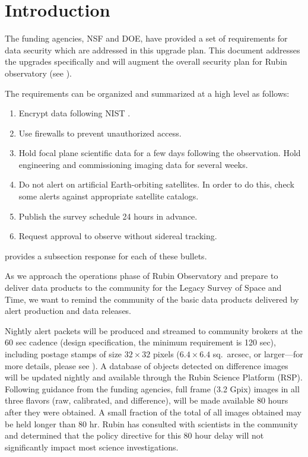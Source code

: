 \section{Introduction}

The funding agencies, NSF and DOE,  have provided a set of requirements for data security which are addressed in this upgrade plan.  This document addresses the upgrades specifically and will augment the overall security plan for Rubin observatory (see ).

The requirements can be organized and summarized at a high level as follows:
\begin{enumerate}

\item	Encrypt data following \gls{NIST} .
\item	Use firewalls to prevent unauthorized  access.
\item	Hold focal plane scientific data for a few days following the observation. Hold engineering and commissioning imaging data for several weeks.
\item	Do not alert on artificial Earth-orbiting satellites.
In order to do this, check some alerts against appropriate satellite catalogs.
\item	Publish the survey schedule 24 hours in advance.
\item	Request approval to observe without sidereal tracking.

\end{enumerate}

 provides a subsection response for each of these bullets.

As we approach the operations phase of Rubin Observatory and prepare to deliver data products to the community for the Legacy Survey of Space and Time, we want to remind the community of the basic data products delivered by alert production and data releases.

Nightly alert packets will be produced and streamed to community brokers at the 60 sec cadence (design specification, the minimum requirement is 120 sec), including postage stamps of size $32 \times 32$ pixels ($6.4 \times 6.4$ sq.\ arcsec, or larger---for more details, please see ).
A database of objects detected on difference images will be updated nightly and available through the Rubin Science Platform (RSP).
Following guidance from the funding agencies, full frame (3.2 Gpix) images in all three flavors (raw, calibrated, and difference), will be made available 80 hours after they were obtained.
A small fraction of the total of all images obtained may be held longer than 80 hr.
Rubin has consulted with scientists in the community and determined that the policy directive for this 80 hour delay will not significantly impact most science investigations.

